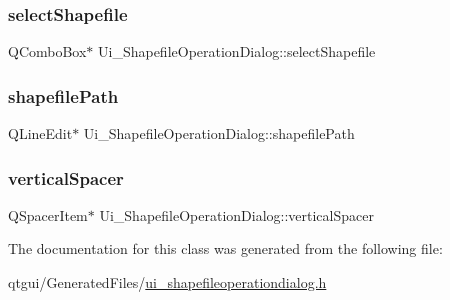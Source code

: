 \subsubsection{\texorpdfstring{selectShapefile}{selectShapefile}}
{\footnotesize\ttfamily Q\+Combo\+Box$\ast$ Ui\+\_\+\+Shapefile\+Operation\+Dialog\+::select\+Shapefile}

\mbox{\label{class_ui___shapefile_operation_dialog_a90bb34d075dde96388931b02f167ee60}} 
\subsubsection{\texorpdfstring{shapefilePath}{shapefilePath}}
{\footnotesize\ttfamily Q\+Line\+Edit$\ast$ Ui\+\_\+\+Shapefile\+Operation\+Dialog\+::shapefile\+Path}

\mbox{\label{class_ui___shapefile_operation_dialog_abdd812679272d65234e6ff9b85f0e303}} 
\subsubsection{\texorpdfstring{verticalSpacer}{verticalSpacer}}
{\footnotesize\ttfamily Q\+Spacer\+Item$\ast$ Ui\+\_\+\+Shapefile\+Operation\+Dialog\+::vertical\+Spacer}



The documentation for this class was generated from the following file\+:\begin{DoxyCompactItemize}
\item 
qtgui/\+Generated\+Files/\mbox{\hyperlink{ui__shapefileoperationdialog_8h}{ui\+\_\+shapefileoperationdialog.\+h}}\end{DoxyCompactItemize}

